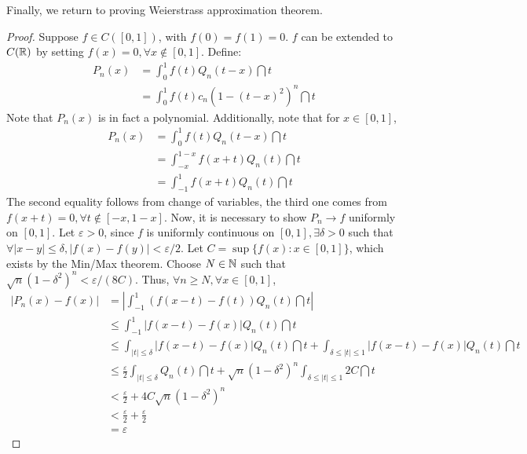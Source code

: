 \vspace{1em}
Finally, we return to proving Weierstrass approximation theorem.
\begin{proof}
    Suppose $f \in C([0, 1])$, with $f(0) = f(1) = 0$. $f$ can be extended to $C(\mathbb{R})$ by setting $f(x) = 0, \forall x \not \in [0,1]$. Define:
    \begin{align*}
        P_n(x) &= \int_0^1 f(t) Q_n(t - x) \dint t \\
        &= \int_0^1 f(t) c_n (1 - (t - x)^2)^n \dint t
    \end{align*}
    Note that $P_n(x)$ is in fact a polynomial. Additionally, note that for $x \in [0,1]$,
    \begin{align*}
        P_n(x) &= \int_0^1 f(t) Q_n(t - x) \dint t \\
        &= \int_{-x}^{1 - x} f(x + t)Q_n(t) \dint t \\
        &= \int_{-1}^1 f(x + t)Q_n(t)\dint t
    \end{align*}
    The second equality follows from change of variables, the third one comes from $f(x + t) = 0, \forall t \not \in [-x, 1 - x]$.
    Now, it is necessary to show $P_n \to f$ uniformly on $[0,1]$. Let $\varepsilon > 0$, since $f$ is uniformly continuous on $[0,1], \exists \delta > 0$ such that $\forall |x-y| \leq \delta, |f(x) - f(y)| < \varepsilon/2$. Let $C = \sup \{f(x):x \in [0,1]\}$, which exists by the Min/Max theorem. Choose $N \in \mathbb{N}$ such that $\sqrt{n}(1 - \delta^2)^n < \varepsilon/(8C)$. Thus, $\forall n \geq N, \forall x \in [0,1]$,
    \begin{align*}
        |P_n(x) - f(x)| &= \left |
            \int_{-1}^1 (f(x-t) - f(t))Q_n(t) \dint t
        \right | \\
        & \leq \int_{-1}^1 |f(x - t) - f(x)| Q_n(t) \dint t \\
        & \leq \int_{|t| \leq \delta} |f(x - t) - f(x)| Q_n(t) \dint t + \int_{\delta \leq |t| \leq 1} |f(x - t) - f(x)| Q_n(t) \dint t \\
        & \leq \frac{\varepsilon}{2}\int_{|t| \leq \delta} Q_n(t) \dint t + \sqrt{n}(1 - \delta^2)^n \int_{\delta \leq |t| \leq 1} 2C \dint t \\
        &< \frac{\varepsilon}{2} + 4C \sqrt{n}(1 - \delta^2)^n \\
        &< \frac{\varepsilon}{2} + \frac{\varepsilon}{2} \\
        &= \varepsilon
    \end{align*}
\end{proof}

